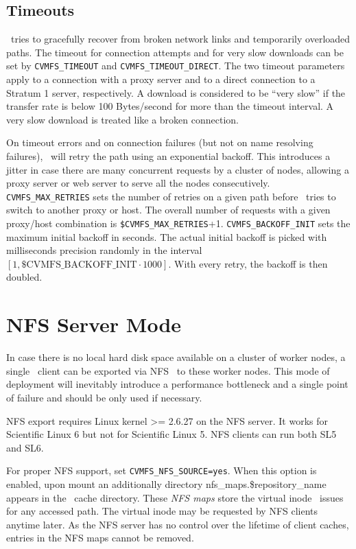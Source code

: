 \subsection{Timeouts}
\cvmfs\ tries to gracefully recover from broken network links and temporarily overloaded paths.
The timeout for connection attempts and for very slow downloads can be set by \texttt{CVMFS\_TIMEOUT} and \texttt{CVMFS\_TIMEOUT\_DIRECT}.
The two timeout parameters apply to a connection with a proxy server and to a direct connection to a Stratum 1 server, respectively.
A download is considered to be ``very slow'' if the transfer rate is below 100 Bytes/second for more than the timeout interval.
A very slow download is treated like a broken connection.

On timeout errors and on connection failures (but not on name resolving failures), \cvmfs\ will retry the path using an exponential backoff.
This introduces a jitter in case there are many concurrent requests by a cluster of nodes, allowing a proxy server or web server to serve all the nodes consecutively.
\texttt{CVMFS\_MAX\_RETRIES} sets the number of retries on a given path before \cvmfs\ tries to switch to another proxy or host. 
The overall number of requests with a given proxy/host combination is \texttt{\$CVMFS\_MAX\_RETRIES}+1.
\texttt{CVMFS\_BACKOFF\_INIT} sets the maximum initial backoff in seconds.  
The actual initial backoff is picked with milliseconds precision randomly in the interval $[1, \text{\$CVMFS\_BACKOFF\_INIT}\cdot 1000]$.
With every retry, the backoff is then doubled.

\section{NFS Server Mode}
In case there is no local hard disk space available on a cluster of worker nodes, a single \cvmfs\ client can be exported via NFS~\cite{rfc1813,rfc3530} to these worker nodes.
This mode of deployment will inevitably introduce a performance bottleneck and a single point of failure and should be only used if necessary.

NFS export requires Linux kernel >= 2.6.27 on the NFS server. 
It works for Scientific Linux 6 but not for Scientific Linux 5. 
NFS clients can run both SL5 and SL6.

For proper NFS support, set \texttt{CVMFS\_NFS\_SOURCE=yes}. 
When this option is enabled, upon mount an additionally directory nfs\_maps.\$repository\_name appears in the \cvmfs\ cache directory.
These \emph{NFS maps} store the virtual inode \cvmfs\ issues for any accessed path.
The virtual inode may be requested by NFS clients anytime later.
As the NFS server has no control over the lifetime of client caches, entries in the NFS maps cannot be removed.

